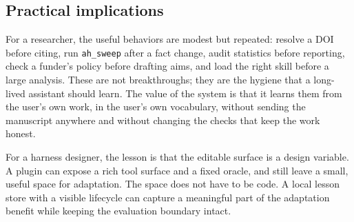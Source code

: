 \subsection{Practical implications}
For a researcher, the useful behaviors are modest but repeated: resolve a DOI before citing, run \texttt{ah\_sweep} after a fact change, audit statistics before reporting, check a funder's policy before drafting aims, and load the right skill before a large analysis. These are not breakthroughs; they are the hygiene that a long-lived assistant should learn. The value of the system is that it learns them from the user's own work, in the user's own vocabulary, without sending the manuscript anywhere and without changing the checks that keep the work honest.

For a harness designer, the lesson is that the editable surface is a design variable. A plugin can expose a rich tool surface and a fixed oracle, and still leave a small, useful space for adaptation. The space does not have to be code. A local lesson store with a visible lifecycle can capture a meaningful part of the adaptation benefit while keeping the evaluation boundary intact.
